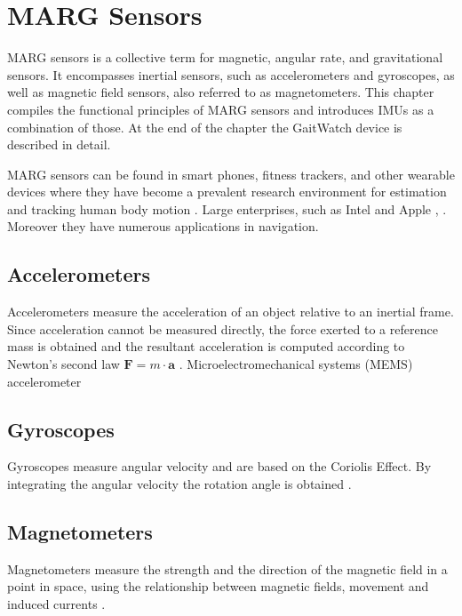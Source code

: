 \chapter{MARG Sensors}
\label{ch:MARG}

MARG sensors is a collective term for magnetic, angular rate, and gravitational sensors. It encompasses inertial sensors, such as accelerometers and gyroscopes, as well as magnetic field sensors, also referred to as magnetometers. This chapter compiles the functional principles of MARG sensors and introduces \glspl{IMU} as a combination of those. At the end of the chapter the GaitWatch device is described in detail.

MARG sensors can be found in smart phones, fitness trackers, and other wearable devices where they have become a prevalent research environment for estimation and tracking human body motion \cite{bennett_motion_2014}. Large enterprises, such as Intel and Apple \cite{Intel_2013}\cite{Apple_2015}, . Moreover they have numerous applications in navigation.

\section{Accelerometers}

Accelerometers measure the acceleration of an object relative to an inertial frame. Since acceleration cannot be measured directly, the force exerted to a reference mass is obtained and the resultant acceleration is computed according to Newton's second law $ \mathbf{F} = m \cdot \mathbf a $ \cite{encyclopedia_britannica_accelerometer_2014}. Microelectromechanical systems (MEMS) accelerometer 

\section{Gyroscopes}

Gyroscopes measure angular velocity and are based on the Coriolis Effect. By integrating the angular velocity the rotation angle is obtained \cite{olivares_vicente_signal_2013}.

\section{Magnetometers}

Magnetometers measure the strength and the direction of the magnetic field in a point in space, using the relationship between magnetic fields, movement and induced currents \cite{olivares_vicente_signal_2013}.

